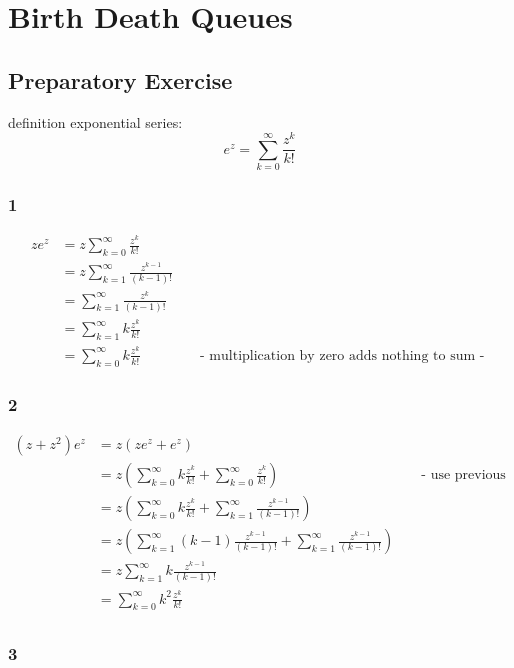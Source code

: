 \section{Birth Death Queues}

\subsection*{Preparatory Exercise}

definition exponential series:  $$e^z = \sum_{k=0}^{\infty} \frac{z^k}{k!}$$

\subsubsection*{1}

\begin{align*}
    z e^z &= z \sum_{k=0}^{\infty} \frac{z^k}{k!} \\
    &= z \sum_{k=1}^{\infty} \frac{z^{k-1}}{(k-1)!}\\
    &= \sum_{k=1}^{\infty} \frac{z^k}{(k-1)!} \\
    &= \sum_{k=1}^{\infty} k\frac{z^k}{k!} \\
    &= \sum_{k=0}^{\infty}{k\frac{z^k}{k!}} && \text{ - multiplication by zero adds nothing to sum - }
\end{align*}

\subsubsection*{2}

\begin{align*}
    (z + z^2) e^z &= z(z e^z+ e^z)\\
    &= z \left( \sum_{k=0}^{\infty}{k\frac{z^k}{k!}} + \sum_{k=0}^{\infty} \frac{z^k}{k!}\right) && \text{ - use previous identities - }\\
    &= z \left( \sum_{k=0}^{\infty}{k\frac{z^k}{k!}} + \sum_{k=1}^{\infty} \frac{z^{k-1}}{(k-1)!}\right) \\
    &= z \left( \sum_{k=1}^{\infty}{(k-1)\frac{z^{k-1}}{(k-1)!}} + \sum_{k=1}^{\infty} \frac{z^{k-1}}{(k-1)!}\right) \\
    &= z \sum_{k=1}^{\infty} k \frac{z^{k-1}}{(k-1)!} \\
    &= \sum_{k=0}^{\infty} k^2 \frac{z^k}{k!} \\
\end{align*}

\clearpage

\subsubsection*{3}

